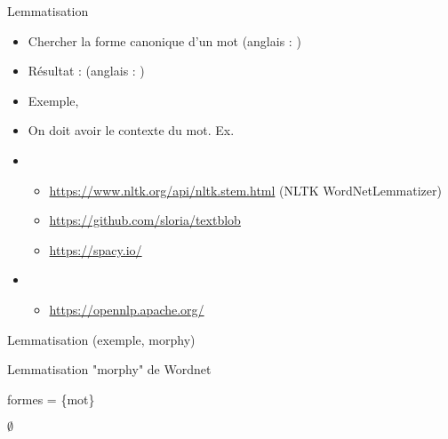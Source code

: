 \documentclass{KodeBook}
\begin{document}
Lemmatisation
\begin{itemize}
	\item Chercher la forme canonique d'un mot (anglais : )
	\item Résultat :  (anglais : )
	\item Exemple, 
	\item On doit avoir le contexte du mot. Ex. 
	\item {}
	\begin{itemize}
		\item \url{https://www.nltk.org/api/nltk.stem.html} (NLTK WordNetLemmatizer)
		\item \url{https://github.com/sloria/textblob}
		\item \url{https://spacy.io/}
	\end{itemize}
	\item {}
	\begin{itemize}
		\item \url{https://opennlp.apache.org/}
	\end{itemize}
\end{itemize}

Lemmatisation (exemple, morphy)
\begin{block}{Lemmatisation "morphy" de Wordnet}
	\footnotesize
	\begin{algorithm}[H]
		
		
		formes = \{mot\}
		
		
		\Return $ \emptyset $\;
		
	\end{algorithm}
\end{block}




\begin{discussion}



\end{discussion}

\ifx\wholebook\relax\else
% 
% 
	
\end{document}
